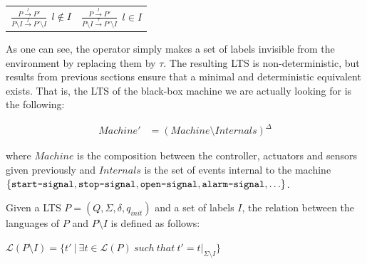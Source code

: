 \begin{center}
\begin{tabular}{cc}
$\frac{\displaystyle P \stackrel{l}{\longrightarrow} P'}{\displaystyle P \setminus I \stackrel{l}{\longrightarrow} P' \setminus I}~~l \notin I$ & 
$\frac{\displaystyle P \stackrel{l}{\longrightarrow} P'}{\displaystyle P \setminus I \stackrel{\tau}{\longrightarrow} P' \setminus I}~~l \in I$ \\
\end{tabular}
\end{center}

As one can see, the operator simply makes a set of labels invisible from the environment by replacing them by $\tau$. The resulting LTS is non-deterministic, but results from previous sections ensure that a minimal and deterministic equivalent exists. That is, the LTS of the black-box machine we are actually looking for is the following:

\vspace{-0.8cm}
\begin{align*}
Machine' &= (Machine \setminus Internals)^\Delta
\end{align*}
\vspace{-0.8cm}

\noindent where $Machine$ is the composition between the controller, actuators and sensors given previously and $Internals$ is the set of events internal to the machine $\{\texttt{start-signal}, \texttt{stop-signal}, \texttt{open-signal}, \texttt{alarm-signal}, \ldots\}$. 

Given a LTS $P = (Q,\Sigma,\delta,q_{init})$ and a set of labels $I$, the relation between the languages of $P$ and $P \setminus I$ is defined as follows:

\begin{center}
$\mathcal{L}(P \setminus I) = \{ t'~|~\exists t \in \mathcal{L}(P)~such~that~t' = t|_{\Sigma \setminus I}\}$
\end{center}

